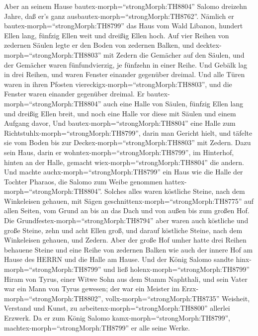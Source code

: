  Aber an seinem Hause bautex-morph=``strongMorph:TH8804''
Salomo dreizehn Jahre, daß er's ganz
ausbautex-morph=``strongMorph:TH8762''.  Nämlich er
bautex-morph=``strongMorph:TH8799'' das Haus vom Wald Libanon, hundert
Ellen lang, fünfzig Ellen weit und dreißig Ellen hoch. Auf vier Reihen
von zedernen Säulen legte er den Boden von zedernen Balken, 
und decktex-morph=``strongMorph:TH8803'' mit Zedern die Gemächer auf den
Säulen, und der Gemächer waren fünfundvierzig, je fünfzehn in einer
Reihe.  Und Gebälk lag in drei Reihen, und waren Fenster
einander gegenüber dreimal.  Und alle Türen waren in ihren
Pfosten viereckigx-morph=``strongMorph:TH8803'', und die Fenster waren
einander gegenüber dreimal.  Er
bautex-morph=``strongMorph:TH8804'' auch eine Halle von Säulen, fünfzig
Ellen lang und dreißig Ellen breit, und noch eine Halle vor diese mit
Säulen und einem Aufgang davor,  Und
bautex-morph=``strongMorph:TH8804'' eine Halle zum
Richtstuhlx-morph=``strongMorph:TH8799'', darin man Gericht hielt, und
täfelte sie vom Boden bis zur Deckex-morph=``strongMorph:TH8803'' mit
Zedern.  Dazu sein Haus, darin er
wohntex-morph=``strongMorph:TH8799'', im Hinterhof, hinten an der Halle,
gemacht wiex-morph=``strongMorph:TH8804'' die andern. Und machte
auchx-morph=``strongMorph:TH8799'' ein Haus wie die Halle der Tochter
Pharaos, die Salomo zum Weibe genommen
hattex-morph=``strongMorph:TH8804''.  Solches alles waren
köstliche Steine, nach dem Winkeleisen gehauen, mit Sägen
geschnittenx-morph=``strongMorph:TH8775'' auf allen Seiten, vom Grund an
bis an das Dach und von außen bis zum großen Hof.  Die
Grundfestex-morph=``strongMorph:TH8794'' aber waren auch köstliche und
große Steine, zehn und acht Ellen groß,  und darauf
köstliche Steine, nach dem Winkeleisen gehauen, und Zedern.
 Aber der große Hof umher hatte drei Reihen behauene Steine
und eine Reihe von zedernen Balken wie auch der innere Hof am Hause des
HERRN und die Halle am Hause.  Und der König Salomo sandte
hinx-morph=``strongMorph:TH8799'' und ließ
holenx-morph=``strongMorph:TH8799'' Hiram von Tyrus,  einer
Witwe Sohn aus dem Stamm Naphthali, und sein Vater war ein Mann von
Tyrus gewesen; der war ein Meister im Erzx-morph=``strongMorph:TH8802'',
vollx-morph=``strongMorph:TH8735'' Weisheit, Verstand und Kunst, zu
arbeitenx-morph=``strongMorph:TH8800'' allerlei Erzwerk. Da er zum König
Salomo kamx-morph=``strongMorph:TH8799'',
machtex-morph=``strongMorph:TH8799'' er alle seine Werke. 
